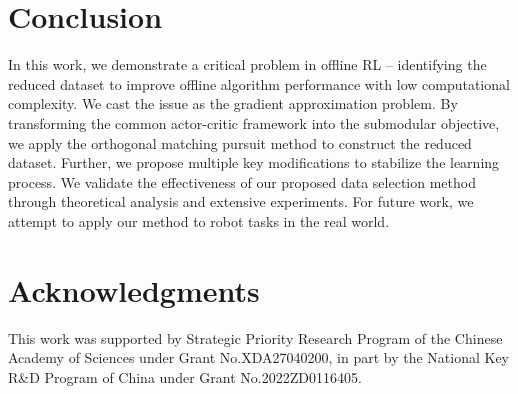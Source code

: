 \section{Conclusion}
In this work, we demonstrate a critical problem in offline RL -- identifying the reduced dataset to improve offline algorithm performance with low computational complexity.
We cast the issue as the gradient approximation problem.
By transforming the common actor-critic framework into the submodular objective, we apply the orthogonal matching pursuit method to construct the reduced dataset.
Further, we propose multiple key modifications to stabilize the learning process.
We validate the effectiveness of our proposed data selection method through theoretical analysis and extensive experiments.
For future work, we attempt to apply our method to robot tasks in the real world.

\section*{Acknowledgments}
This work was supported by Strategic Priority Research Program of the Chinese Academy of Sciences under Grant No.XDA27040200, in part by the National Key R\&D Program of China under Grant No.2022ZD0116405.

